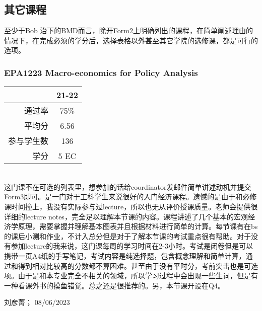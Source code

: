 \vspace{\betsubsec} %
\subsection{其它课程}

至少于Bob 治下的BMD而言，除开Form2上明确列出的课程，在简单阐述理由的情况下，在完成必须的学分后，选择表格以外甚至其它学院的选修课，都是可行的选项。

\subsubsection{EPA1223 Macro-economics for Policy Analysis}
\begin{minipage}{0.45\textwidth}
\centering
{}
\end{minipage}%
\begin{minipage}{0.45\textwidth}
\raggedleft
\begin{tabular}{r|c}
\textbf{ } & \textbf{21-22} \\ \hline
通过率 &75\% \\ 
平均分 & 6.56 \\ 
参与学生数 &136 \\
学分 & 5 EC\\
\end{tabular}
\end{minipage}\\

这门课不在可选的列表里，想参加的话给coordinator发邮件简单讲述动机并提交Form3即可。是一门对于工科学生来说很好的入门经济课程。遗憾的是由于和必修课时间撞上，我没有实际参与过lecture，所以也无从评价授课质量。老师会提供很详细的lecture notes，完全足以理解本节课的内容。课程讲述了几个基本的宏观经济学原理，需要掌握并理解基本图表并且根据材料进行简单的计算。每节课有在bs的课后小测和作业，不计入总分但是对于了解本节课的考试重点很有帮助。对于没有参加lecture的我来说，这门课每周的学习时间在2-3小时。考试是闭卷但是可以携带一页A4纸的手写笔记，考试内容是纯选择题，包含概念理解和简单计算，通过和得到相对比较高的分数都不算困难。甚至由于没有平时分，考前突击也是可选项。由于是和本专业完全不相关的领域，所以学习过程中会出现一些生词，但是有一种看课外书的摸鱼错觉。总之还是很推荐的。另，本节课开设在Q4。

\begin{flushright}
刘彦菁； 08/06/2023
\end{flushright}